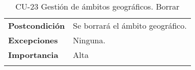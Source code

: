 \begin{longtable}[t]{@{}ll@{}}
\begin{minipage}[t]{0.23\columnwidth}\raggedright\strut
\textbf{Postcondición}\strut
\end{minipage} & \begin{minipage}[t]{0.71\columnwidth}\raggedright\strut
Se borrará el ámbito geográfico.\strut
\end{minipage}\tabularnewline
\begin{minipage}[t]{0.23\columnwidth}\raggedright\strut
\textbf{Excepciones}\strut
\end{minipage} & \begin{minipage}[t]{0.71\columnwidth}\raggedright\strut
Ninguna. \strut
\end{minipage}\tabularnewline
\begin{minipage}[t]{0.23\columnwidth}\raggedright\strut
\textbf{Importancia}\strut
\end{minipage} & \begin{minipage}[t]{0.71\columnwidth}\raggedright\strut
Alta\strut
\end{minipage}\tabularnewline
\bottomrule
\caption{CU-23 Gestión de ámbitos geográficos. Borrar}
\end{longtable}

